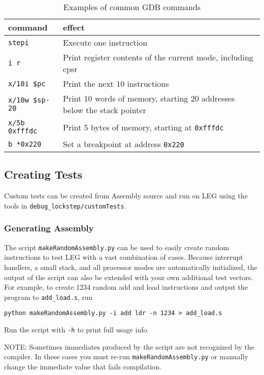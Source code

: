\begin{table}
\centering
\begin{tabular}{|l|p{10cm}|}
\hline \textbf{command} & \textbf{effect} \\ 
\hline \texttt{stepi} & Execute one instruction \\ 
\hline \texttt{i r} & Print register contents of the current mode, including cpsr \\ 
\hline \texttt{x/10i \$pc} & Print the next 10 instructions \\ 
\hline \texttt{x/10w \$sp-20} & Print 10 words of memory, starting 20 addresses below the stack pointer \\ 
\hline \texttt{x/5b 0xfffdc} & Print 5 bytes of memory, starting at \texttt{0xfffdc} \\ 
\hline \texttt{b *0x220} & Set a breakpoint at address \texttt{0x220} \\ 
\hline 
\end{tabular} 
\caption{Examples of common GDB commands}
\label{table:gdb}
\end{table}

\subsection{Creating Tests}
Custom tests can be created from Assembly source and run on LEG using the tools in \texttt{debug\_lockstep/customTests}.

\subsubsection{Generating Assembly}\label{sec:randasm}
The script \texttt{makeRandomAssembly.py} can be used to easily create random instructions to test LEG with a vast combination of cases.
Because interrupt handlers, a small stack, and all processor modes are automatically initialized, the output of the script can also be extended with your own additional test vectors.
For example, to create 1234 random add and load instructions and output the program to \texttt{add\_load.s}, run
\begin{verbatim}python makeRandomAssembly.py -i add ldr -n 1234 > add_load.s\end{verbatim}
Run the script with \texttt{-h} to print full usage info.

NOTE: Sometimes immediates produced by the script are not recognized by the compiler. 
In these cases you must re-run \texttt{makeRandomAssembly.py} or manually change the immediate value that fails compilation.

